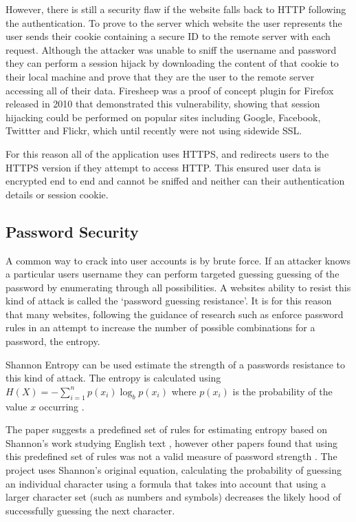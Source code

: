 However, there is still a security flaw if the website falls back to HTTP following the authentication. To prove to the server which website the user represents the user sends their cookie containing a secure ID to the remote server with each request. Although the attacker was unable to sniff the username and password they can perform a session hijack by downloading the content of that cookie to their local machine and prove that they are the user to the remote server accessing all of their data. 
% 
Firesheep was a proof of concept plugin for Firefox released in 2010 that demonstrated this vulnerability, showing that session hijacking could be performed on popular sites including Google, Facebook, Twittter and Flickr, which until recently were not using sidewide SSL.

For this reason all of the application uses HTTPS, and redirects users to the HTTPS version if they attempt to access HTTP. This ensured user data is encrypted end to end and cannot be sniffed and neither can their authentication details or session cookie.

\subsection{Password Security}

A common way to crack into user accounts is by brute force. If an attacker knows a particular users username they can perform targeted guessing guessing of the password by enumerating through all possibilities. A websites ability to resist this kind of attack is called the `password guessing resistance'. It is for this reason that many websites, following the guidance of research such as \cite{needed} enforce password rules in an attempt to increase the number of possible combinations for a password, the entropy.

Shannon Entropy can be used estimate the strength of a passwords resistance to this kind of attack. The entropy is calculated using $H(X)= -\sum_{i=1}^n{p(x_i)\log_b p(x_i)}$ where $p(x_i)$ is the probability of the value $x$ occurring \cite{burr2013electronic}.

The paper suggests a predefined set of rules for estimating entropy based on Shannon's work studying English text \cite{burr2013electronic}, however other papers found that using this predefined set of rules was not a valid measure of password strength \cite{weir2010shannon}.
% 
The project uses Shannon's original equation, calculating the probability of guessing an individual character using a formula that takes into account that using a larger character set (such as numbers and symbols) decreases the likely hood of successfully guessing the next character.

